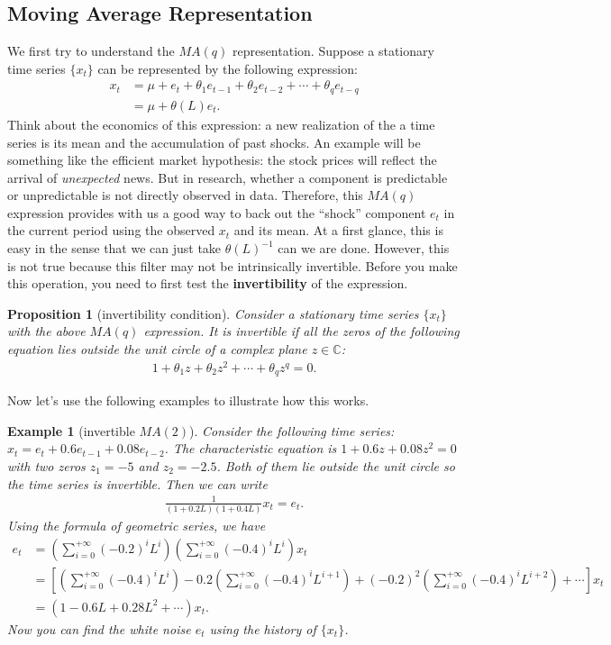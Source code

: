 \documentclass[12pt]{article}
\newtheorem{proposition}[theorem]{Proposition}
\newtheorem{example}{Example}
\begin{document}
\subsection{Moving Average Representation}
We first try to understand the $MA(q)$ representation. Suppose a stationary time series $\{x_t\}$ can be represented by the following expression:
\begin{align*}
    x_t &= \mu + e_t + \theta_1 e_{t-1} + \theta_2 e_{t-2} + \cdots + \theta_q e_{t-q}\\
    &= \mu + \theta(L) e_t.
\end{align*}
Think about the economics of this expression: a new realization of the a time series is its mean and the accumulation of past shocks. An example will be something like the efficient market hypothesis: the stock prices will reflect the arrival of \textit{unexpected} news. But in research, whether a component is predictable or unpredictable is not directly observed in data. Therefore, this $MA(q)$ expression provides with us a good way to back out the ``shock'' component $e_t$ in the current period using the observed $x_t$ and its mean. At a first glance, this is easy in the sense that we can just take $\theta(L)^{-1}$ can we are done. However, this is not true because this filter may not be intrinsically invertible. Before you make this operation, you need to first test the \textbf{invertibility} of the expression.
\begin{proposition}[invertibility condition]
    Consider a stationary time series $\{x_t\}$ with the above $MA(q)$ expression. It is invertible if all the zeros of the following equation lies outside the unit circle of a complex plane $z \in \mathbb{C}$:
    \begin{align*}
        1 + \theta_1 z + \theta_2 z^2 + \cdots + \theta_q z^q = 0.
    \end{align*}
\end{proposition}
Now let's use the following examples to illustrate how this works.
\begin{example}[invertible $MA(2)$]
    Consider the following time series: $x_t = e_t + 0.6 e_{t-1} + 0.08 e_{t-2}$. The characteristic equation is $1 + 0.6 z + 0.08 z^2 = 0$ with two zeros $z_1 = -5$ and $z_2 = -2.5$. Both of them lie outside the unit circle so the time series is invertible. Then we can write
    \begin{align*}
        \frac{1}{(1+0.2L)(1+0.4L)} x_t = e_t.
    \end{align*}
    Using the formula of geometric series, we have
    \begin{align*}
        e_t &= \left(\sum_{i=0}^{+\infty}(-0.2)^i L^i\right)\left(\sum_{i=0}^{+\infty}(-0.4)^i L^i\right) x_t \\
        &= \left[\left(\sum_{i=0}^{+\infty}(-0.4)^i L^i\right) -0.2\left(\sum_{i=0}^{+\infty}(-0.4)^i L^{i+1}\right) + (-0.2)^2\left(\sum_{i=0}^{+\infty}(-0.4)^i L^{i+2}\right) + \cdots \right] x_t\\
        &= (1 - 0.6L + 0.28 L ^2 + \cdots) x_t.
    \end{align*}
    Now you can find the white noise $e_t$ using the history of $\{x_t\}$.
\end{example}
\end{document}
